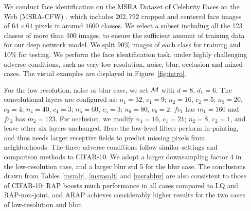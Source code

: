 \documentclass[10pt,twocolumn,twoside]{IEEEtran} %
\begin{document}
We conduct face identification on the MSRA Dataset of Celebrity Faces on the Web (MSRA-CFW) \cite{zhang2012finding}, 
which includes $202, 792$ cropped and centered face images of $64\times64$ pixels in around $1600$ classes. We select a subset including all the 123 classes of more than $300$ images, to ensure the sufficient amount of training data for our deep network model. We split 90\% images of each class for training and 10\% for testing. We perform the face identification task, under highly challenging adverse conditions, such as very low resolution, noise, blur, occlusion and mixed cases. The visual examples are displayed in Figure~\ref{fig:intro}.

For the low resolution, noise or blur case, we set ${\mathcal{M}}$ with $d = 8$,  $d_1 = 6$. The convolutional layers are configured as: $n_1 = 32$, $c_1 = 9$;  $n_2 = 16$, $c_2 = 5$;  $n_3 = 20$, $c_3 = 4$; $n_4 = 40$, $c_4 = 3$; $n_5 = 60$, $c_5 = 3$; $n_6 = 80$, $c_6 = 2$. $fc_1$ has $m_1 = 160$ and $fc_2$ has $m_2 = 123$. For occlusion, we modify $n_1 = 16$, $c_1 = 21$;  $n_2 = 8$, $c_2 = 1$, and leave other six layers unchanged. Here the low-level filters perform in-painting, and thus needs larger receptive fields to predict missing pixels from neighborhoods. 
The three adverse conditions follow similar settings and comparison methods to CIFAR-10. We adopt a larger downsampling factor 4 in the low-resolution case, and a larger blur std 5 for the blur case. The conclusions drawn from Tables \ref{msralr}, \ref{msrasalt} and \ref{msrablur} are also consistent to those of CIFAR-10: RAP boosts much performance in all cases compared to LQ and RAP-non-joint, and ARAP achieves considerably higher results for the two cases of low-resolution and blur.
\end{document}
